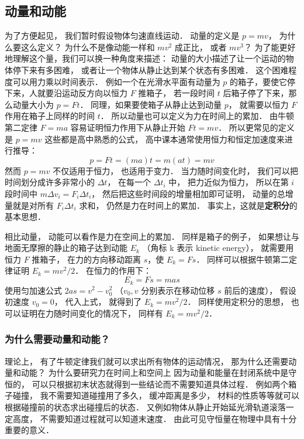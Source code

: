 

\subsection{动量和动能}
为了方便起见， 我们暂时假设物体匀速直线运动． 动量的定义是 $p = mv$， 为什么要这么定义？ 为什么不是像动能一样和 $mv^2$ 成正比， 或者 $mv^3$？ 为了能更好地理解这个量，我们可以换一种角度来描述： 动量的大小描述了让一个运动的物体停下来有多困难， 或者让一个物体从静止达到某个状态有多困难． 这个困难程度可以用力乘以时间表示． 例如一个在光滑水平面有动量为 $p$ 的箱子，要使它停下来，人就要沿运动反方向以恒力 $F$ 推箱子， 若一段时间 $t$ 后箱子停了下来，那么动量大小为 $p = Ft$．%
同理，如果要使箱子从静止达到动量 $p$， 就需要以恒力 $F$ 作用在箱子上同样的时间 $t$． 所以动量也可以定义为力在时间上的累加． 由牛顿第二定律 $F = ma$ 容易证明恒力作用下从静止开始 $Ft = mv$． 所以更常见的定义是 $p = mv$ 这些都是高中熟悉的公式， 高中课本通常使用恒力和恒定加速度来进行推导：
\begin{equation}
p = Ft = (ma)t = m(at) = mv
\end{equation}
然而 $p = mv$ 不仅适用于恒力， 也适用于变力． 当力随时间变化时， 我们可以把时间划分成许多非常小的 $\Delta t$， 在每一个 $\Delta t_i$ 中， 把力近似为恒力， 所以在第 $i$ 段时间中 $m\Delta v_i = F_i\Delta t_i$， 然后把这些时间段的增量相加即可证明， 动量的总增量就是对所有 $F_i\Delta t_i$ 求和， 仍然是力在时间上的累加． 事实上，这就是\textbf{定积分}的基本思想．

相比动量， 动能可以看作是力在空间上的累加． 同样是箱子的例子， 如果想让与地面无摩擦的静止的箱子达到动能 $E_k$ （角标 k 表示 kinetic energy）， 就需要用恒力 $F$ 推箱子， 在力的方向移动距离 $s$，使 $E_k = Fs$． 同样可以根据牛顿第二定律证明 $E_k = mv^2/2$． 在恒力的作用下：
\begin{equation}
E_k = Fs = mas
\end{equation}
使用匀加速公式 $2as = v^2 - v_0^2$ （$v_0, v$ 分别表示在移动位移 $s$ 前后的速度）， 假设初速度 $v_0 = 0$， 代入上式， 就得到了 $E_k = mv^2/2$． 同样使用定积分的思想， 也可以证明在力随时间变化的情况下， 同样有 $E_k = mv^2/2$．

\subsubsection{为什么需要动量和动能？}
理论上， 有了牛顿定律我们就可以求出所有物体的运动情况， 那为什么还需要动量和动能？ 为什么要研究力在时间上和空间上 因为动量和能量在封闭系统中是守恒的， 可以只根据初末状态就得到一些结论而不需要知道具体过程． 例如两个箱子碰撞， 我不需要知道碰撞用了多久， 缓冲距离是多少， 材料的性质等等就可以根据碰撞前的状态求出碰撞后的状态． 又例如物体从静止开始延光滑轨道滚落一定高度， 不需要知道过程就可以知道末速度． 由此可见守恒量在物理中具有十分重要的意义．


